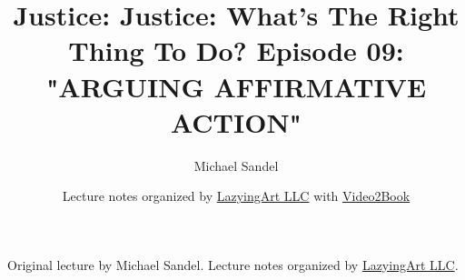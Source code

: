 \documentclass[11pt,oneside]{book}
\begin{document}
\frontmatter
\title{Justice: Justice: What's The Right Thing To Do? Episode 09: "ARGUING AFFIRMATIVE ACTION"}
\author{Michael Sandel}
\date{Lecture notes organized by \href{https://lazying.art}{LazyingArt LLC} with \href{https://github.com/lachlanchen/Video2Book}{Video2Book}}
\maketitle
\begin{center}
\small Original lecture by Michael Sandel. Lecture notes organized by \href{https://lazying.art}{LazyingArt LLC}.
\end{center}
\clearpage
\mainmatter

\end{document}

